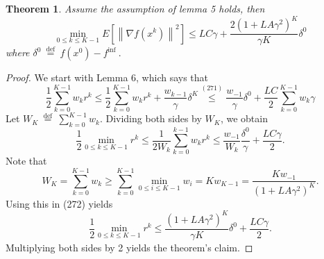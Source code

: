 \documentclass[8pt,a4paper]{article}
\newtheorem{theorem}{Theorem}
\begin{document}
	\begin{theorem}
		Assume the assumption of lemma 5 holds, then$$
		\min _{0 \leq k \leq K-1} E\left[\left\|\nabla f\left(x^{k}\right)\right\|^{2}\right] \leq L C \gamma+\frac{2\left(1+L A \gamma^{2}\right)^{K}}{\gamma K} \delta^{0}
		$$
		where $\delta^{0} \stackrel{\text { def }}{=} f\left(x^{0}\right)-f^{\text {inf }} .$
	\end{theorem}
	
	\begin{proof}
		We start with Lemma 6, which says that
		$$
		\frac{1}{2} \sum_{k=0}^{K-1} w_{k} r^{k} \leq \frac{1}{2} \sum_{k=0}^{K-1} w_{k} r^{k}+\frac{w_{k-1}}{\gamma} \delta^{K} \stackrel{(271)}{\leq} \frac{w_{-1}}{\gamma} \delta^{0}+\frac{L C}{2} \sum_{k=0}^{K-1} w_{k} \gamma
		$$
		Let $W_{K} \stackrel{\text { def }}{=} \sum_{k=0}^{K-1} w_{k}$. Dividing both sides by $W_{K}$, we obtain
		$$
		\frac{1}{2} \min _{0 \leq k \leq K-1} r^{k} \leq \frac{1}{2 W_{k}} \sum_{k=0}^{k-1} w_{k} r^{k} \leq \frac{w_{-1}}{W_{k}} \frac{\delta^{0}}{\gamma}+\frac{L C \gamma}{2} .
		$$
		Note that
		$$
		W_{K}=\sum_{k=0}^{K-1} w_{k} \geq \sum_{k=0}^{K-1} \min _{0 \leq i \leq K-1} w_{i}=K w_{K-1}=\frac{K w_{-1}}{\left(1+L A \gamma^{2}\right)^{K}} .
		$$
		Using this in (272) yields
		$$
		\frac{1}{2} \min _{0 \leq k \leq K-1} r^{k} \leq \frac{\left(1+L A \gamma^{2}\right)^{K}}{\gamma K} \delta^{0}+\frac{L C \gamma}{2} .
		$$
		Multiplying both sides by 2 yields the theorem's claim.
	\end{proof}
	
	
	
	
	
	
	
	
	
	
	
	
	
	
	
	
	
	
	
	
	
	
	
	
\end{document}
